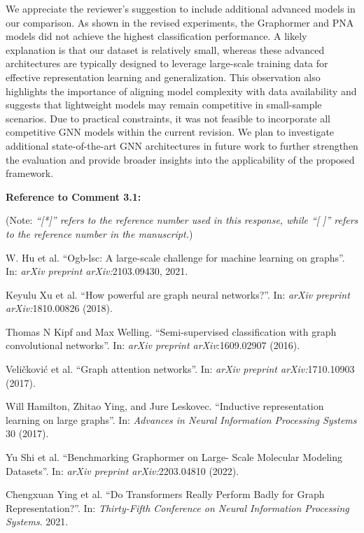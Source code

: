 \documentclass[12pt,technote,onecolumn]{IEEEtran}
\begin{document}
We appreciate the reviewer’s suggestion to include additional advanced models in our comparison. As shown in the revised experiments, the Graphormer and PNA models did not achieve the highest classification performance. A likely explanation is that our dataset is relatively small, whereas these advanced architectures are typically designed to leverage large-scale training data for effective representation learning and generalization. This observation also highlights the importance of aligning model complexity with data availability and suggests that lightweight models may remain competitive in small-sample scenarios. Due to practical constraints, it was not feasible to incorporate all competitive GNN models within the current revision. We plan to investigate additional state-of-the-art GNN architectures in future work to further strengthen the evaluation and provide broader insights into the applicability of the proposed framework.

\vspace{1mm}

\noindent \textbf{Reference to Comment 3.1:} 

\noindent(Note: \textit{``[*]'' refers to the reference number used in this response, while ``[ ]'' refers to the reference number in the manuscript.})

\noindent[*1]\:W. Hu et al. ``Ogb-lsc: A large-scale challenge for machine learning on graphs”. In: \textit{arXiv preprint arXiv:}2103.09430, 2021.

\noindent[54]\:Keyulu Xu et al. ``How powerful are graph neural
networks?”. In: \textit{arXiv preprint arXiv:}1810.00826 (2018).

\noindent[56]\:Thomas N Kipf and Max Welling. ``Semi-supervised
classification with graph convolutional networks”. In:
\textit{arXiv preprint arXiv}:1609.02907 (2016).

\noindent[57]\:Veli{\v{c}}kovi{\'c} et al. ``Graph attention networks”. In:
\textit{arXiv preprint arXiv:}1710.10903 (2017).

\noindent[58]\:Will Hamilton, Zhitao Ying, and Jure Leskovec. ``Inductive
representation learning on large graphs”. In:
\textit{Advances in Neural Information Processing Systems} 30
(2017).

\noindent[63]\:Yu Shi et al. ``Benchmarking Graphormer on Large-
Scale Molecular Modeling Datasets”. In: \textit{arXiv preprint
arXiv:}2203.04810 (2022).

\noindent[64]\:Chengxuan Ying et al. ``Do Transformers Really Perform
Badly for Graph Representation?”. In: \textit{Thirty-Fifth
Conference on Neural Information Processing Systems}.
2021.
\end{document}

